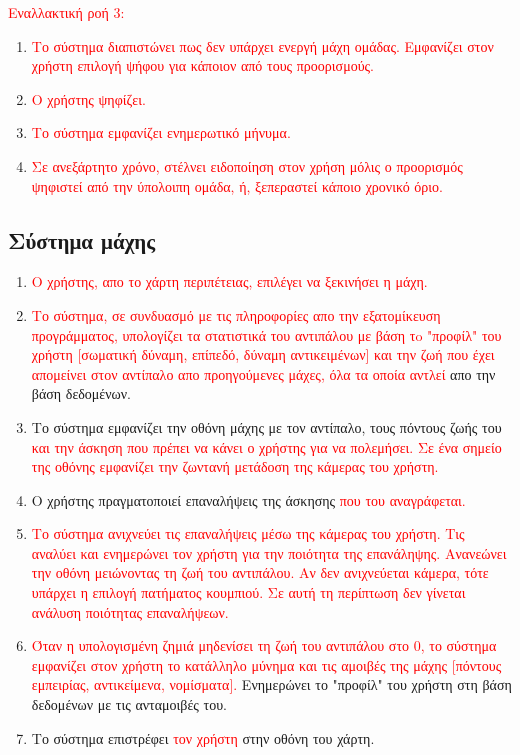 \textcolor{red}{Εναλλακτική ροή 3:}
\begin{enumerate}[label=2.\alph*.,ref=2.\alph*]
\item \textcolor{red}{Το σύστημα διαπιστώνει πως δεν υπάρχει ενεργή μάχη ομάδας. Εμφανίζει στον χρήστη επιλογή ψήφου για κάποιον από τους προορισμούς.}
\item \textcolor{red}{Ο χρήστης ψηφίζει.}
\item \textcolor{red}{Το σύστημα εμφανίζει ενημερωτικό μήνυμα.}
\item \textcolor{red}{Σε ανεξάρτητο χρόνο, στέλνει ειδοποίηση στον χρήση μόλις ο προορισμός ψηφιστεί από την ύπολοιπη ομάδα, ή, ξεπεραστεί κάποιο χρονικό όριο.}
\end{enumerate}

\newpage
\subsection{Σύστημα μάχης}
\label{sec:solo}
\begin{enumerate}
    \item \textcolor{red}{Ο χρήστης, απο το χάρτη περιπέτειας, επιλέγει να ξεκινήσει η μάχη.}
    \item \textcolor{red}{Το σύστημα, σε συνδυασμό με τις πληροφορίες απο την εξατομίκευση προγράμματος, υπολογίζει τα στατιστικά του αντιπάλου με βάση τo "προφίλ" του χρήστη [σωματική δύναμη, επίπεδό, δύναμη αντικειμένων] και την ζωή που έχει απομείνει στον αντίπαλο απο προηγούμενες μάχες, όλα τα οποία αντλεί} απο την βάση δεδομένων.
    \item Το σύστημα εμφανίζει την οθόνη μάχης με τον αντίπαλο, τους πόντους ζωής του \textcolor{red}{και την άσκηση που πρέπει να κάνει ο χρήστης για να πολεμήσει. Σε ένα σημείο της οθόνης εμφανίζει την ζωντανή μετάδοση της κάμερας του χρήστη.}
    \item Ο χρήστης πραγματοποιεί επαναλήψεις της άσκησης \textcolor{red}{που του αναγράφεται.}
    \item \textcolor{red}{Το σύστημα ανιχνεύει τις επαναλήψεις μέσω της κάμερας του χρήστη. Τις αναλύει και ενημερώνει τον χρήστη για την ποιότητα της επανάληψης. Ανανεώνει την οθόνη μειώνοντας τη ζωή του αντιπάλου. Αν δεν ανιχνεύεται κάμερα, τότε υπάρχει η επιλογή πατήματος κουμπιού. Σε αυτή τη περίπτωση δεν γίνεται ανάλυση ποιότητας επαναλήψεων.}
    \item \textcolor{red}{Όταν η υπολογισμένη ζημιά μηδενίσει τη ζωή του αντιπάλου στο 0, το σύστημα εμφανίζει στον χρήστη το κατάλληλο μύνημα και τις αμοιβές της μάχης [πόντους εμπειρίας, αντικείμενα, νομίσματα].} Ενημερώνει το "προφίλ" του χρήστη στη βάση δεδομένων με τις ανταμοιβές του.
    \item Το σύστημα επιστρέφει \textcolor{red}{τον χρήστη} στην οθόνη του χάρτη.
\end{enumerate}

